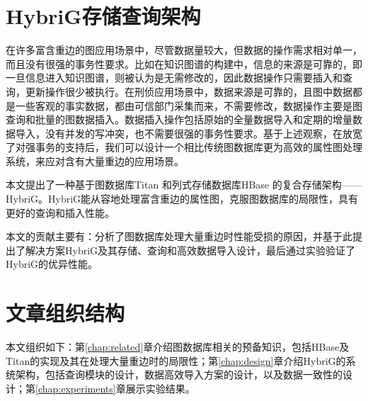 \section{HybriG存储查询架构}
在许多富含重边的图应用场景中，尽管数据量较大，但数据的操作需求相对单一，而且没有很强的事务性要求。比如在知识图谱的构建中\supercite{knowledge_graph}，信息的来源是可靠的，即一旦信息进入知识图谱，则被认为是无需修改的，因此数据操作只需要插入和查询，更新操作很少被执行。在刑侦应用场景中，数据来源是可靠的，且图中数据都是一些客观的事实数据，都由可信部门采集而来，不需要修改，数据操作主要是图查询和批量的图数据插入。数据插入操作包括原始的全量数据导入和定期的增量数据导入，没有并发的写冲突，也不需要很强的事务性要求。基于上述观察，在放宽了对强事务的支持后，我们可以设计一个相比传统图数据库更为高效的属性图处理系统，来应对含有大量重边的应用场景。

本文提出了一种基于图数据库Titan 和列式存储数据库HBase 的复合存储架构——HybriG。HybriG能从容地处理富含重边的属性图，克服图数据库的局限性，具有更好的查询和插入性能。

本文的贡献主要有：分析了图数据库处理大量重边时性能受损的原因，并基于此提出了解决方案HybriG及其存储、查询和高效数据导入设计，最后通过实验验证了HybriG的优异性能。

\section{文章组织结构}
本文组织如下：第\ref{chap:related}章介绍图数据库相关的预备知识，包括HBase及Titan的实现及其在处理大量重边时的局限性；第\ref{chap:design}章介绍HybriG的系统架构，包括查询模块的设计，数据高效导入方案的设计，以及数据一致性的设计；第\ref{chap:experiments}章展示实验结果。


